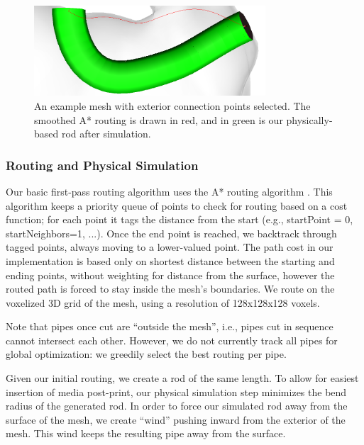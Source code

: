 \begin{figure}[h!]
\centering
    \includegraphics[width=3.4in]{figures/exterior.png}
\caption{An example mesh with exterior connection points selected.  The smoothed A* routing is drawn in {\color{red}red}, and in {\color{tovi}green} is our physically-based rod after simulation.}
\label{fig:tool-process-exterior}
\end{figure}

\subsubsection{Routing and Physical Simulation}

Our basic first-pass routing algorithm uses the A* routing algorithm \cite{Hart-Astar}.  This algorithm keeps a priority queue of points to check for routing based on a cost function; for each point it tags the distance from the start (e.g., startPoint = 0, startNeighbors=1, ...).  Once the end point is reached, we backtrack through tagged points, always moving to a lower-valued point.  The path cost in our implementation is based only on shortest distance between the starting and ending points, without weighting for distance from the surface, however the routed path is forced to stay inside the mesh's boundaries.  We route on the voxelized 3D grid of the mesh, using a resolution of 128x128x128 voxels. 

Note that pipes once cut are ``outside the mesh'', i.e., pipes cut in sequence cannot intersect each other.  However, we do not currently track all pipes for global optimization: we greedily select the best routing per pipe.

Given our initial routing, we create a rod of the same length.  To allow for easiest insertion of media post-print, our physical simulation step minimizes the bend radius of the generated rod.  In order to force our simulated rod away from the surface of the mesh, we create ``wind'' pushing inward from the exterior of the mesh.  This wind keeps the resulting pipe away from the surface.  

